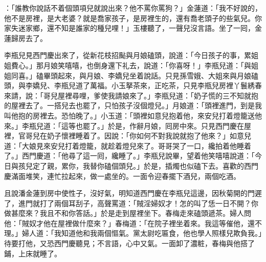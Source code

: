 ：「誰教你說話不着個頭項兒就說出來？他不罵你罵狗？」金蓮道：「我不好說的，他不是房裡，是大老婆？就是喬家孩子，是房裡生的，還有喬老頭子的些氣兒。你家失迷家鄉，還不知是誰家的種兒哩！」玉樓聽了，一聲兒沒言語。坐了一囘，金蓮歸房去了。

李瓶兒見西門慶出來了，從新花枝招颭與月娘磕頭，說道：「今日孩子的事，累姐姐費心。」{}那月娘笑嘻嘻，也倒身還下礼去，說道：「你喜呀！」李瓶兒道：「與姐姐同喜。」磕畢頭起來，與月娘、李嬌兒坐着說話。只見孫雪娥、大姐來與月娘磕頭，與李嬌兒、李瓶兒道了萬福。小玉拏茶來，正吃茶，只見李瓶兒房裡丫鬟綉春來請，說：「哥兒屋裡尋哩，爹使我請娘來了。」李瓶兒道：「奶子慌的三不知就抱的屋裡去了。一搭兒去也罷了，只怕孩子沒個燈兒。」月娘道：「頭裡進門，到是我叫他抱的房裡去。恐怕晚了。」小玉道：「頭裡如意兒抱着他，來安兒打着燈籠送他來。」李瓶兒道：「這等也罷了。」於是，作辭月娘，囘房中來。只見西門慶在屋裡，官哥兒在奶子懷裡睡着了。因說：「你如何不對我說就抱了他來？」如意兒道：「大娘見來安兒打着燈籠，就趁着燈兒來了。哥哥哭了一口，纔拍着他睡着了。」西門慶道：「他尋了這一囘，纔睡了。」李瓶兒說畢，望着他笑嘻嘻說道：「今日與孩兒定了親，累你，我替你磕個頭兒。」於是，插燭也似磕下去。喜歡的西門慶滿面堆笑，連忙拉起來，做一處坐的。一面令迎春擺下酒兒，兩個吃酒。

且說潘金蓮到房中使性子，沒好氣，明知道西門慶在李瓶兒這邊，因秋菊開的門遲了，進門就打了兩個耳刮子，高聲罵道：「賊淫婦奴才！怎的叫了恁一日不開？你做甚麼來？我且不和你答話。」於是走到屋裡坐下。春梅走來磕頭遞茶。婦人問他：「賊奴才他在屋裡做什麼來？」春梅道：「在院子裡坐着來。我這等催他，還不理。」婦人道：「我知道他和我兩個慪氣。黨太尉吃匾食，他也學人照樣兒欺負我。」待要打他，又恐西門慶聽見；不言語，心中又氣。{}一面卸了濃粧，春梅與他搭了鋪，上床就睡了。

